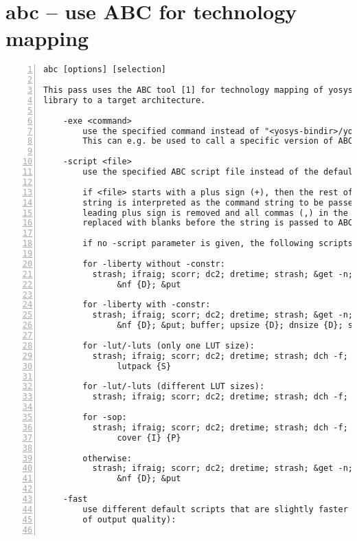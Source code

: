 
\section{abc -- use ABC for technology mapping}
\label{cmd:abc}
\begin{lstlisting}[numbers=left,frame=single]
    abc [options] [selection]

This pass uses the ABC tool [1] for technology mapping of yosys's internal gate
library to a target architecture.

    -exe <command>
        use the specified command instead of "<yosys-bindir>/yosys-abc" to execute ABC.
        This can e.g. be used to call a specific version of ABC or a wrapper.

    -script <file>
        use the specified ABC script file instead of the default script.

        if <file> starts with a plus sign (+), then the rest of the filename
        string is interpreted as the command string to be passed to ABC. The
        leading plus sign is removed and all commas (,) in the string are
        replaced with blanks before the string is passed to ABC.

        if no -script parameter is given, the following scripts are used:

        for -liberty without -constr:
          strash; ifraig; scorr; dc2; dretime; strash; &get -n; &dch -f;
               &nf {D}; &put

        for -liberty with -constr:
          strash; ifraig; scorr; dc2; dretime; strash; &get -n; &dch -f;
               &nf {D}; &put; buffer; upsize {D}; dnsize {D}; stime -p

        for -lut/-luts (only one LUT size):
          strash; ifraig; scorr; dc2; dretime; strash; dch -f; if; mfs2;
               lutpack {S}

        for -lut/-luts (different LUT sizes):
          strash; ifraig; scorr; dc2; dretime; strash; dch -f; if; mfs2

        for -sop:
          strash; ifraig; scorr; dc2; dretime; strash; dch -f;
               cover {I} {P}

        otherwise:
          strash; ifraig; scorr; dc2; dretime; strash; &get -n; &dch -f;
               &nf {D}; &put

    -fast
        use different default scripts that are slightly faster (at the cost
        of output quality):


\end{lstlisting}

